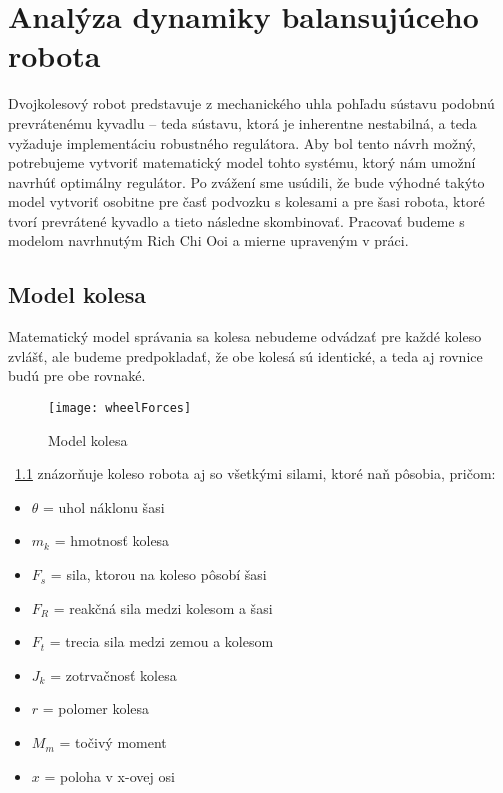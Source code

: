 \chapter{Analýza dynamiky balansujúceho robota}
\label{ch:analyza}

Dvojkolesový robot predstavuje z mechanického uhla pohľadu sústavu podobnú prevrátenému kyvadlu – teda sústavu, ktorá je inherentne nestabilná, a teda vyžaduje implementáciu robustného regulátora. Aby bol tento návrh možný, potrebujeme vytvoriť matematický model tohto systému, ktorý nám umožní navrhúť optimálny regulátor. Po zvážení sme usúdili, že bude výhodné takýto model vytvoriť osobitne pre časť podvozku s kolesami a pre šasi robota, ktoré tvorí prevrátené kyvadlo a tieto následne skombinovať.
Pracovať budeme s modelom navrhnutým Rich Chi Ooi \cite{Oochi2003} a mierne upraveným v práci\cite{TWIP}.

\section{Model kolesa}

Matematický model správania sa kolesa nebudeme odvádzať pre každé koleso zvlášť, ale budeme predpokladať, že obe kolesá sú identické, a teda aj rovnice budú pre obe rovnaké.
\begin{figure}
\centering
\texttt{[image: wheelForces]}
\caption{Model kolesa}
\label{fig:wheelForces}
\end{figure}

\figurename~\ref{fig:wheelForces} znázorňuje koleso robota aj so všetkými silami, ktoré naň pôsobia, pričom:

\begin{multicols}{2}
\begin{itemize}
\item $\theta$ = uhol náklonu šasi
\item $m_k$ = hmotnosť kolesa 
\item $F_s$ = sila, ktorou na koleso pôsobí šasi
\item $F_R$ = reakčná sila medzi kolesom a šasi
\item $F_t$ = trecia sila medzi zemou a kolesom
\item $J_k$ = zotrvačnosť kolesa
\item $r$ = polomer kolesa 
\item $M_m$ = točivý moment
\item $x$ = poloha v x-ovej osi
\end{itemize}
\end{multicols}

